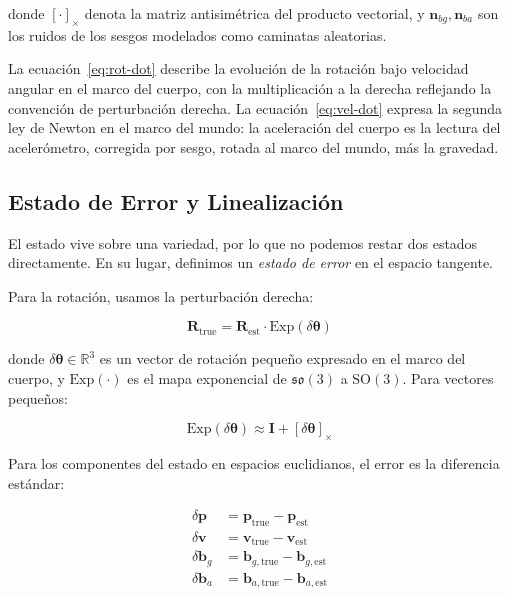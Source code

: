 donde $[\cdot]_\times$ denota la matriz antisimétrica del producto vectorial, y
$\mathbf{n}_{bg}, \mathbf{n}_{ba}$ son los ruidos de los sesgos modelados como
caminatas aleatorias.

La ecuación~\eqref{eq:rot-dot} describe la evolución de la rotación bajo
velocidad angular en el marco del cuerpo, con la multiplicación a la derecha
reflejando la convención de perturbación derecha. La
ecuación~\eqref{eq:vel-dot} expresa la segunda ley de Newton en el marco del
mundo: la aceleración del cuerpo es la lectura del acelerómetro, corregida por
sesgo, rotada al marco del mundo, más la gravedad.

\subsection{Estado de Error y Linealización}
\label{sec:fej-estado-error}

El estado vive sobre una variedad, por lo que no podemos restar dos estados
directamente. En su lugar, definimos un \emph{estado de error} en el espacio
tangente.

Para la rotación, usamos la perturbación derecha:

\begin{equation}
\mathbf{R}_{\text{true}} = \mathbf{R}_{\text{est}} \cdot \mathrm{Exp}(\delta\boldsymbol{\theta})
\label{eq:rot-error}
\end{equation}

donde $\delta\boldsymbol{\theta} \in \mathbb{R}^3$ es un vector de rotación pequeño
expresado en el marco del cuerpo, y $\mathrm{Exp}(\cdot)$ es el mapa exponencial
de $\mathfrak{so}(3)$ a $\mathrm{SO}(3)$. Para vectores pequeños:

\begin{equation}
\mathrm{Exp}(\delta\boldsymbol{\theta}) \approx \mathbf{I} + [\delta\boldsymbol{\theta}]_\times
\label{eq:exp-approx}
\end{equation}

Para los componentes del estado en espacios euclidianos, el error es la diferencia
estándar:

\begin{align}
\delta\mathbf{p} &= \mathbf{p}_{\text{true}} - \mathbf{p}_{\text{est}} \\
\delta\mathbf{v} &= \mathbf{v}_{\text{true}} - \mathbf{v}_{\text{est}} \\
\delta\mathbf{b}_g &= \mathbf{b}_{g,\text{true}} - \mathbf{b}_{g,\text{est}} \\
\delta\mathbf{b}_a &= \mathbf{b}_{a,\text{true}} - \mathbf{b}_{a,\text{est}}
\end{align}

